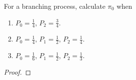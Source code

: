 \begin{problem}{4.66}
  For a branching process, calculate $\pi_0$ when
  \begin{enumerate}
    \item $P_0 = \frac{1}{4}$, $P_2 = \frac{3}{4}$.
    \item $P_0 = \frac{1}{4}$, $P_1 = \frac{1}{2}$, $P_2 = \frac{1}{4}$.
    \item $P_0 = \frac{1}{6}$, $P_1 = \frac{1}{2}$, $P_2 = \frac{1}{3}$.
  \end{enumerate}
\end{problem}

\begin{proof}
\end{proof}
\newpage
